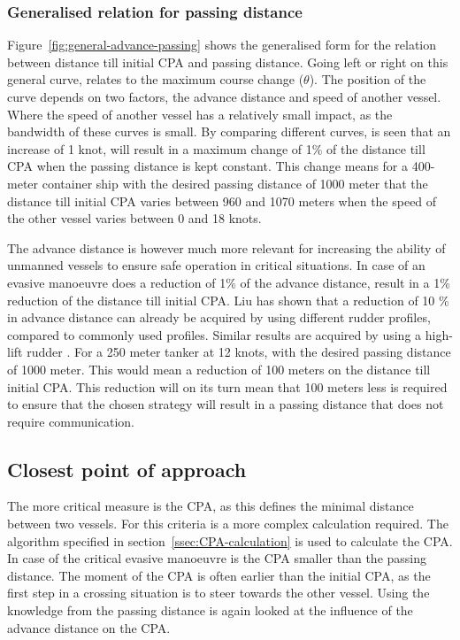 \subsubsection{Generalised relation for passing distance}
Figure~\ref{fig:general-advance-passing} shows the generalised form for the relation between distance till initial CPA and passing distance.
Going left or right on this general curve, relates to the maximum course change ($\theta$). The position of the curve depends on two factors, the advance distance and speed of another vessel. Where the speed of another vessel has a relatively small impact, as the bandwidth of these curves is small. By comparing different curves, is seen that an increase of 1 knot, will result in a maximum change of 1\% of the distance till \ac{CPA} when the passing distance is kept constant. This change means for a 400-meter container ship with the desired passing distance of 1000 meter that the distance till initial CPA varies between 960 and 1070 meters when the speed of the other vessel varies between 0 and 18 knots.

\clearpage

The advance distance is however much more relevant for increasing the ability of unmanned vessels to ensure safe operation in critical situations. In case of an evasive manoeuvre does a reduction of 1\% of the advance distance, result in a 1\% reduction of the distance till initial CPA.
Liu \cite{Liu2015a} has shown that a reduction of 10 \% in advance distance can already be acquired by using different rudder profiles, compared to commonly used profiles. Similar results are acquired by using a high-lift rudder \cite{Zaky2018}. For a 250 meter tanker at 12 knots, with the desired passing distance of 1000 meter. This would mean a reduction of 100 meters on the distance till initial CPA. This reduction will on its turn mean that 100 meters less is required to ensure that the chosen strategy will result in a passing distance that does not require communication.

\subsection{Closest point of approach}
The more critical measure is the \ac{CPA}, as this defines the minimal distance between two vessels. For this criteria is a more complex calculation required. The algorithm specified in section~\ref{ssec:CPA-calculation} is used to calculate the CPA. In case of the critical evasive manoeuvre is the CPA smaller than the passing distance. The moment of the \ac{CPA} is often earlier than the initial CPA, as the first step in a crossing situation is to steer towards the other vessel. Using the knowledge from the passing distance is again looked at the influence of the advance distance on the CPA.

